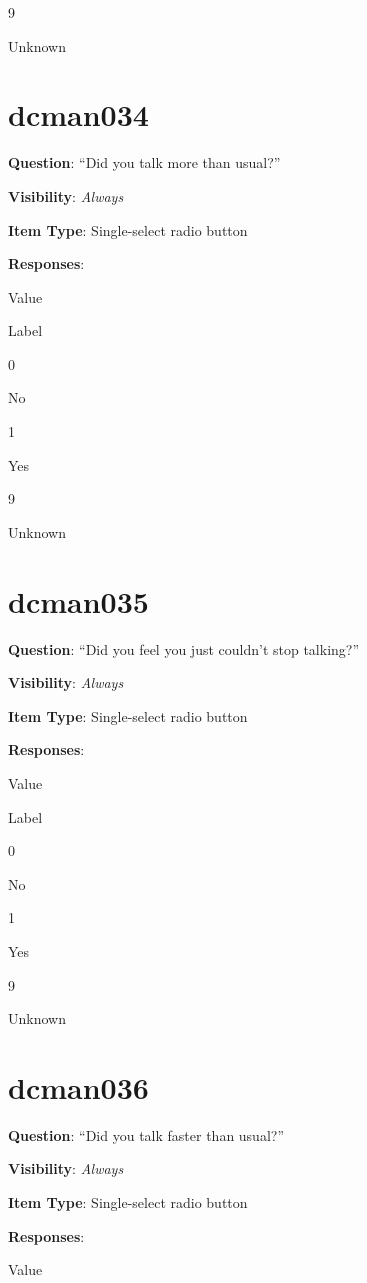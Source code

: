 \documentclass[]{book}
\begin{document}
9

Unknown

\hypertarget{dcman034}{%
\section{dcman034}\label{dcman034}}

\textbf{Question}: ``Did you talk more than usual?''

\textbf{Visibility}: \emph{Always}

\textbf{Item Type}: Single-select radio button

\textbf{Responses}:

Value

Label

0

No

1

Yes

9

Unknown

\hypertarget{dcman035}{%
\section{dcman035}\label{dcman035}}

\textbf{Question}: ``Did you feel you just couldn't stop talking?''

\textbf{Visibility}: \emph{Always}

\textbf{Item Type}: Single-select radio button

\textbf{Responses}:

Value

Label

0

No

1

Yes

9

Unknown

\hypertarget{dcman036}{%
\section{dcman036}\label{dcman036}}

\textbf{Question}: ``Did you talk faster than usual?''

\textbf{Visibility}: \emph{Always}

\textbf{Item Type}: Single-select radio button

\textbf{Responses}:

Value
\end{document}
